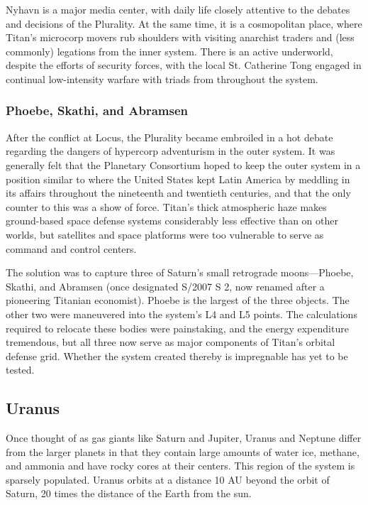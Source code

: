 Nyhavn is a major media center, with daily life
closely attentive to the debates and decisions of
the Plurality. At the same time, it is a cosmopolitan
place, where Titan's microcorp movers rub shoulders
with visiting anarchist traders and (less commonly)
legations from the inner system. There is an active
underworld, despite the efforts of security forces,
with the local St. Catherine Tong engaged in continual low-intensity warfare with triads from throughout
the system.

\subsubsection{Phoebe, Skathi, and Abramsen}
\label{sec:phoebe-skathi-abrams}

After the conflict at Locus, the Plurality became embroiled in a hot
debate regarding the dangers of hypercorp adventurism in the outer
system. It was generally felt that the Planetary Consortium hoped to
keep the outer system in a position similar to where the United States
kept Latin America by meddling in its affairs throughout the
nineteenth and twentieth centuries, and that the only counter to this
was a show of force. Titan's thick atmospheric haze makes ground-based
space defense systems considerably less effective than on other
worlds, but satellites and space platforms were too vulnerable to
serve as command and control centers.

The solution was to capture three of Saturn's small retrograde
moons—Phoebe, Skathi, and Abramsen (once designated S/2007 S 2, now
renamed after a pioneering Titanian economist). Phoebe is the largest
of the three objects. The other two were maneuvered into the system's
L4 and L5 points. The calculations required to relocate these bodies
were painstaking, and the energy expenditure tremendous, but all three
now serve as major components of Titan's orbital defense grid. Whether
the system created thereby is impregnable has yet to be tested.

\subsection{Uranus}
\label{sec:uranus}

Once thought of as gas giants like Saturn and Jupiter, Uranus and
Neptune differ from the larger planets in that they contain large
amounts of water ice, methane, and ammonia and have rocky cores at
their centers. This region of the system is sparsely populated. Uranus
orbits at a distance 10 AU beyond the orbit of Saturn, 20 times the
distance of the Earth from the sun.

